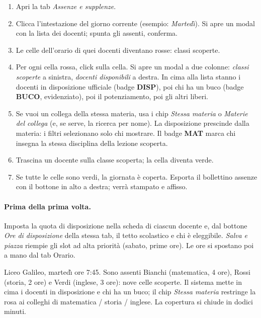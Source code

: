 \begin{enumerate}
\item Apri la tab \emph{Assenze e supplenze}.
\item Clicca l'intestazione del giorno corrente (esempio:
  \emph{Marted\`{\i}}). Si apre un modal con la lista dei
  docenti; spunta gli assenti, conferma.
\item Le celle dell'orario di quei docenti diventano rosse:
  classi scoperte.
\item Per ogni cella rossa, click sulla cella. Si apre un
  modal a due colonne: \emph{classi scoperte} a sinistra,
  \emph{docenti disponibili} a destra. In cima alla lista
  stanno i docenti in disposizione ufficiale (badge
  \textbf{DISP}), poi chi ha un buco (badge \textbf{BUCO},
  evidenziato), poi il potenziamento, poi gli altri liberi.
\item Se vuoi un collega della stessa materia, usa i chip
  \emph{Stessa materia} o \emph{Materie del collega} (e,
  se serve, la ricerca per nome). La disposizione
  prescinde dalla materia: i filtri selezionano solo chi
  mostrare. Il badge \textbf{MAT} marca chi insegna la
  stessa disciplina della lezione scoperta.
\item Trascina un docente sulla classe scoperta; la cella
  diventa verde.
\item Se tutte le celle sono verdi, la giornata \`e coperta.
  Esporta il bollettino assenze con il bottone in alto a
  destra; verr\`a stampato e affisso.
\end{enumerate}

\paragraph{Prima della prima volta.} Imposta la quota di
disposizione nella scheda di ciascun docente e, dal bottone
\emph{Ore di disposizione} della stessa tab, il tetto
scolastico e chi \`e eleggibile. \emph{Salva e piazza}
riempie gli slot ad alta priorit\`a (sabato, prime ore).
Le ore si spostano poi a mano dal tab Orario.

\begin{esempiobox}[title=Caso reale]
Liceo Galileo, marted\`{\i} ore 7:45. Sono assenti Bianchi
(matematica, 4 ore), Rossi (storia, 2 ore) e Verdi (inglese,
3 ore): nove celle scoperte. Il sistema mette in cima i
docenti in disposizione e chi ha un buco; il chip
\emph{Stessa materia} restringe la rosa ai colleghi di
matematica / storia / inglese. La copertura si chiude in
dodici minuti.
\end{esempiobox}

